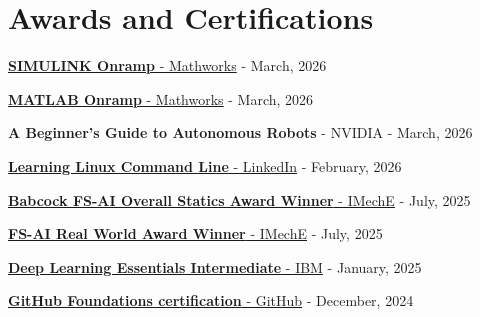 \documentclass[a4paper,20pt]{article}
\begin{document}
\section{Awards and Certifications}
\begin{description}[font=$\bullet$]
	\item {\href{https://matlabacademy.mathworks.com/progress/share/certificate.html?id=b7fde698-68d8-42fe-9724-310f8c223c91&}{\textbf{SIMULINK Onramp} - Mathworks} - March, 2026}
	\vspace{-5pt}
	\item {\href{https://matlabacademy.mathworks.com/progress/share/certificate.html?id=68acf084-2bc7-4102-8946-04df43deefed&}{\textbf{MATLAB Onramp} - Mathworks} - March, 2026}
	\vspace{-5pt}
	\item {{\textbf{A Beginner's Guide to Autonomous Robots} - NVIDIA} - March, 2026}
	\vspace{-5pt}
	\item {\href{https://www.linkedin.com/learning/certificates/74481223c1d7e110d98b0ac25963d1dbd9a8e0df9215617c12fd43cefb27317f?u=2374954}{\textbf{Learning Linux Command Line} - LinkedIn} - February, 2026}
	\vspace{-5pt}
	\item {\href{https://imeche.org/events/formula-student/previous-events/2025-award-winners}{\textbf{Babcock FS-AI Overall Statics Award Winner} - IMechE} - July, 2025}
	\vspace{-5pt}
    \item {\href{https://imeche.org/events/formula-student/previous-events/2025-award-winners}{\textbf{FS-AI Real World Award Winner} - IMechE} - July, 2025}
	\vspace{-5pt}
	\item {\href{https://www.credly.com/badges/dd3240b6-17d3-4841-8749-ca1c196a7bd0/public_url}{\textbf{Deep Learning Essentials Intermediate} - IBM} - January, 2025}
	\vspace{-5pt}
	\item {\href{https://www.credly.com/badges/c1548397-80ef-474f-8cbc-873f5a882eb8/public_url}{\textbf{GitHub Foundations certification} - GitHub} - December, 2024}

\end{description}
\end{document}
